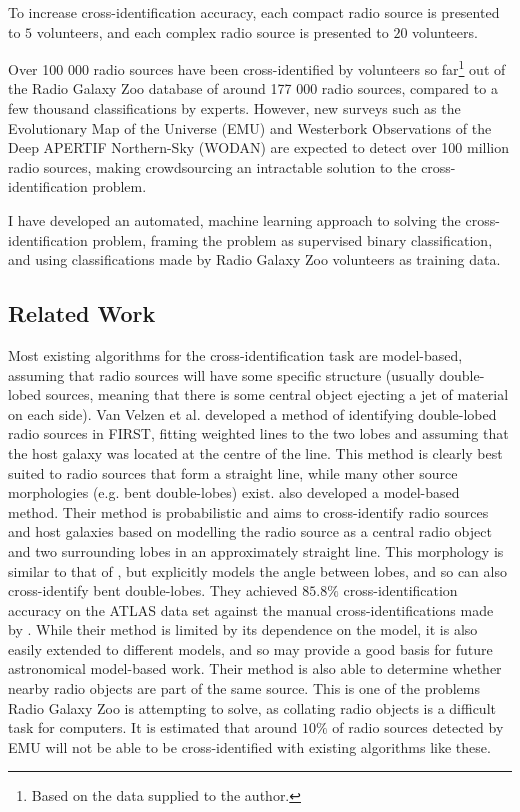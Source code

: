 \documentclass[a4paper]{article}
\begin{document}
      To increase cross-identification accuracy, each compact radio source is presented to $5$ volunteers, and each complex radio source is presented to $20$ volunteers\cite{banfield15}.

      Over 100 000 radio sources have been cross-identified by volunteers so far\footnote{Based on the data supplied to the author.} out of the Radio Galaxy Zoo database of around 177 000 radio sources, compared to a few thousand classifications by experts\cite{banfield15}. However, new surveys such as the Evolutionary Map of the Universe (EMU) \cite{norris11} and Westerbork Observations of the Deep APERTIF Northern-Sky (WODAN) \cite{röttgering11} are expected to detect over 100 million radio sources\cite{banfield15}, making crowdsourcing an intractable solution to the cross-identification problem.

      I have developed an automated, machine learning approach to solving the cross-identification problem, framing the problem as supervised binary classification, and using classifications made by Radio Galaxy Zoo volunteers as training data.

    \subsection{Related Work}

      Most existing algorithms for the cross-identification task are model-based, assuming that radio sources will have some specific structure (usually double-lobed sources, meaning that there is some central object ejecting a jet of material on each side). Van Velzen et al. \cite{vanvelzen15} developed a method of identifying double-lobed radio sources in FIRST, fitting weighted lines to the two lobes and assuming that the host galaxy was located at the centre of the line. This method is clearly best suited to radio sources that form a straight line, while many other source morphologies (e.g. bent double-lobes) exist. \citet{fan15} also developed a model-based method. Their method is probabilistic and aims to cross-identify radio sources and host galaxies based on modelling the radio source as a central radio object and two surrounding lobes in an approximately straight line. This morphology is similar to that of \citet{vanvelzen15}, but explicitly models the angle between lobes, and so can also cross-identify bent double-lobes. They achieved $85.8\%$ cross-identification accuracy on the ATLAS data set against the manual cross-identifications made by \citet{norris06}. While their method is limited by its dependence on the model, it is also easily extended to different models, and so may provide a good basis for future astronomical model-based work. Their method is also able to determine whether nearby radio objects are part of the same source. This is one of the problems Radio Galaxy Zoo is attempting to solve, as collating radio objects is a difficult task for computers. It is estimated that around $10\%$ of radio sources detected by EMU will not be able to be cross-identified with existing algorithms like these\cite{banfield15,norris11}.
\end{document}
